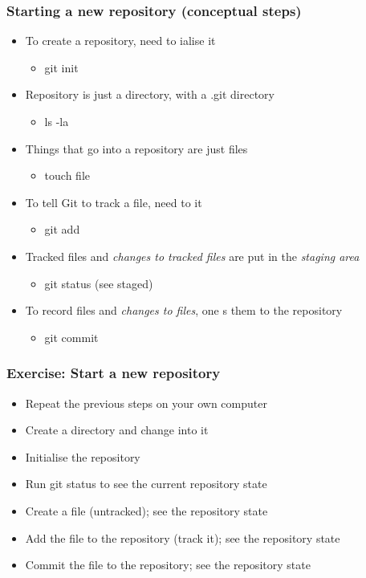\documentclass{git_course}
\begin{document}
\begin{frame}
\frametitle{Starting a new repository (conceptual steps)}
\begin{itemize}
    \item To create a repository, need to ialise it
        \begin{itemize}
            \item git init
        \end{itemize}
    \item Repository is just a directory, with a .git directory
        \begin{itemize}
            \item ls -la
        \end{itemize}
    \item Things that go into a repository are just files
        \begin{itemize}
            \item touch file
        \end{itemize}
    \item To tell Git to track a file, need to  it
        \begin{itemize}
            \item git add
        \end{itemize}
    \item Tracked files and \emph{changes to tracked files} are put in
        the \emph{staging area}
        \begin{itemize}
            \item git status (see staged)
        \end{itemize}
    \item To record files and \emph{changes to files}, one s
        them to the repository
        \begin{itemize}
            \item git commit
        \end{itemize}
\end{itemize}
\end{frame}

\begin{frame}
\frametitle{Exercise: Start a new repository}
\begin{itemize}
    \item Repeat the previous steps on your own computer
    \item Create a directory and change into it
    \item Initialise the repository
    \item Run git status to see the current repository state
    \item Create a file (untracked); see the repository state
    \item Add the file to the repository (track it); see the repository state
    \item Commit the file to the repository; see the repository state
\end{itemize}
\end{frame}
\end{document}
